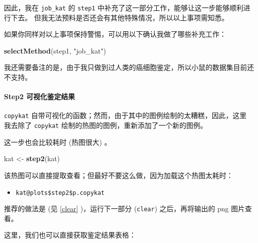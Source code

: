 \documentclass[
]{article}
\newenvironment{Shaded}{\begin{snugshade}}{\end{snugshade}}
\newcommand{\KeywordTok}[1]{\textcolor[rgb]{0.13,0.29,0.53}{\textbf{#1}}}
\newcommand{\NormalTok}[1]{#1}
\newcommand{\OperatorTok}[1]{\textcolor[rgb]{0.81,0.36,0.00}{\textbf{#1}}}
\newcommand{\StringTok}[1]{\textcolor[rgb]{0.31,0.60,0.02}{#1}}
\providecommand{\tightlist}{%
  \setlength{\itemsep}{0pt}\setlength{\parskip}{0pt}}
\begin{document}
因此，我在 \texttt{job\_kat} 的 \texttt{step1} 中补充了这一部分工作，能够让这一步能够顺利进行下去。
但我无法预料是否还会有其他特殊情况，所以以上事项需知悉。

如果你同样对以上事项保持警惕，可以用以下确认我做了哪些补充工作：

\begin{Shaded}
\begin{Highlighting}[]
\KeywordTok{selectMethod}\NormalTok{(step1, }\StringTok{"job\_kat"}\NormalTok{)}
\end{Highlighting}
\end{Shaded}

我还需要备注的是，由于我只做到过人类的癌细胞鉴定，所以小鼠的数据集目前还不支持。

\hypertarget{step2-ux53efux89c6ux5316ux9274ux5b9aux7ed3ux679c}{%
\paragraph{Step2 可视化鉴定结果}\label{step2-ux53efux89c6ux5316ux9274ux5b9aux7ed3ux679c}}

\texttt{copykat} 自带可视化的函数；然而，由于其中的图例绘制的太糟糕，因此，这里
我去除了 \texttt{copykat} 绘制的热图的图例，重新添加了一个新的图例。

这一步也会比较耗时 (热图很大) 。

\begin{Shaded}
\begin{Highlighting}[]
\NormalTok{kat \textless{}{-}}\StringTok{ }\KeywordTok{step2}\NormalTok{(kat)}
\end{Highlighting}
\end{Shaded}

该热图可以直接提取查看；但最好不要这么做，因为加载这个热图太耗时：

\begin{itemize}
\tightlist
\item
  \texttt{kat@plots\$step2\$p.copykat}
\end{itemize}

推荐的做法是 (见 \ref{clear} )，运行下一部分 (\texttt{clear}) 之后，再将输出的 png 图片查看。

这里，我们也可以直接获取鉴定结果表格：

\begin{Shaded}
\end{Shaded}
\end{document}
